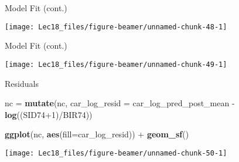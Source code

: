 \documentclass[11pt,ignorenonframetext,]{beamer}
\newenvironment{Shaded}{}{}
\newcommand{\CommentTok}[1]{\textcolor[rgb]{0.38,0.63,0.69}{\textit{#1}}}
\newcommand{\DataTypeTok}[1]{\textcolor[rgb]{0.56,0.13,0.00}{#1}}
\newcommand{\DecValTok}[1]{\textcolor[rgb]{0.25,0.63,0.44}{#1}}
\newcommand{\KeywordTok}[1]{\textcolor[rgb]{0.00,0.44,0.13}{\textbf{#1}}}
\newcommand{\NormalTok}[1]{#1}
\newcommand{\OperatorTok}[1]{\textcolor[rgb]{0.40,0.40,0.40}{#1}}
\newcommand{\StringTok}[1]{\textcolor[rgb]{0.25,0.44,0.63}{#1}}
\let\oldShaded\Shaded
\let\endoldShaded\endShaded
\renewenvironment{Shaded}{\footnotesize\begin{spacing}{0.9}\oldShaded}{\endoldShaded\end{spacing}}
\let\oldverbatim\verbatim
\let\endoldverbatim\endverbatim
\newcommand{\scriptoutput}{
  \renewenvironment{Shaded}{\scriptsize\begin{spacing}{0.9}\oldShaded}{\endoldShaded\end{spacing}}
  \renewenvironment{verbatim}{\scriptsize\begin{spacing}{0.9}\oldverbatim}{\endoldverbatim\end{spacing}}
}
\begin{document}
\begin{frame}{Model Fit (cont.)}
\protect\hypertarget{model-fit-cont.}{}

\begin{center}\texttt{[image: Lec18\_files/figure-beamer/unnamed-chunk-48-1]} \end{center}

\end{frame}

\begin{frame}{Model Fit (cont.)}
\protect\hypertarget{model-fit-cont.-1}{}

\begin{center}\texttt{[image: Lec18\_files/figure-beamer/unnamed-chunk-49-1]} \end{center}

\end{frame}

\begin{frame}[fragile]{Residuals}
\protect\hypertarget{residuals-1}{}

\scriptoutput

\begin{Shaded}
\begin{Highlighting}[]
\NormalTok{nc =}\StringTok{ }\KeywordTok{mutate}\NormalTok{(nc, }\DataTypeTok{car_log_resid =}\NormalTok{ car_log_pred_post_mean }\OperatorTok{-}\StringTok{ }\KeywordTok{log}\NormalTok{((SID74}\OperatorTok{+}\DecValTok{1}\NormalTok{)}\OperatorTok{/}\NormalTok{BIR74))}

\KeywordTok{ggplot}\NormalTok{(nc, }\KeywordTok{aes}\NormalTok{(}\DataTypeTok{fill=}\NormalTok{car_log_resid)) }\OperatorTok{+}\StringTok{ }\KeywordTok{geom_sf}\NormalTok{()}
\end{Highlighting}
\end{Shaded}

\begin{center}\texttt{[image: Lec18\_files/figure-beamer/unnamed-chunk-50-1]} \end{center}

\begin{Shaded}
\end{Shaded}

\end{frame}
\end{document}

